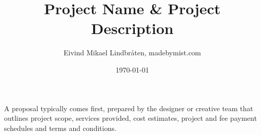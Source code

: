 \documentclass{mist-proposal}
\begin{document}
\title{Project Name \& Project Description}
\date{\today{}}
\author{Eivind Mikael Lindbråten, madebymist.com}

\maketitle{}

A proposal typically comes first, prepared by the designer or creative team that outlines project scope, services provided, cost estimates, project and fee payment schedules and terms and conditions.

%
%





% 

% 

\end{document}

